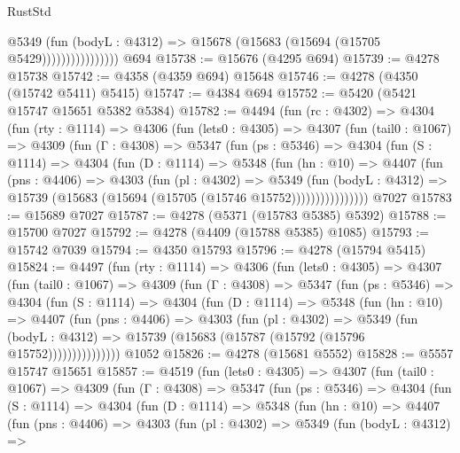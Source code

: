 \begin{lexlean}{RustStd}
\begin{coremodule}
{\begin{coremodule}
{{{{{{{{{{{{{{{{{{{{{{{{{{{{{{{{{{{                          @5349
                            (fun (bodyL : @4312) =>
                            @15678 (@15683 (@15694 (@15705 @5429))))))))))))))))
    @694
@15738 := @15676 (@4295 @694)
@15739 := @4278 @15738
@15742 := @4358 (@4359 @694) @15648
@15746 := @4278 (@4350 (@15742 @5411) @5415)
@15747 := @4384 @694
@15752 := @5420 (@5421 @15747 @15651 @5382 @5384)
@15782 := @4494
    (fun (rc : @4302) =>
    @4304
      (fun (rty : @1114) =>
      @4306
        (fun (lets0 : @4305) =>
        @4307
          (fun (tail0 : @1067) =>
          @4309
            (fun (Γ : @4308) =>
            @5347
              (fun (ps : @5346) =>
              @4304
                (fun (S : @1114) =>
                @4304
                  (fun (D : @1114) =>
                  @5348
                    (fun (hn : @10) =>
                    @4407
                      (fun (pns : @4406) =>
                      @4303
                        (fun (pl : @4302) =>
                        @5349
                          (fun (bodyL : @4312) =>
                          @15739 (@15683 (@15694 (@15705 (@15746 @15752))))))))))))))))
    @7027
@15783 := @15689 @7027
@15787 := @4278 (@5371 (@15783 @5385) @5392)
@15788 := @15700 @7027
@15792 := @4278 (@4409 (@15788 @5385) @1085)
@15793 := @15742 @7039
@15794 := @4350 @15793
@15796 := @4278 (@15794 @5415)
@15824 := @4497
    (fun (rty : @1114) =>
    @4306
      (fun (lets0 : @4305) =>
      @4307
        (fun (tail0 : @1067) =>
        @4309
          (fun (Γ : @4308) =>
          @5347
            (fun (ps : @5346) =>
            @4304
              (fun (S : @1114) =>
              @4304
                (fun (D : @1114) =>
                @5348
                  (fun (hn : @10) =>
                  @4407
                    (fun (pns : @4406) =>
                    @4303
                      (fun (pl : @4302) =>
                      @5349
                        (fun (bodyL : @4312) =>
                        @15739 (@15683 (@15787 (@15792 (@15796 @15752)))))))))))))))
    @1052
@15826 := @4278 (@15681 @5552)
@15828 := @5557 @15747 @15651
@15857 := @4519
    (fun (lets0 : @4305) =>
    @4307
      (fun (tail0 : @1067) =>
      @4309
        (fun (Γ : @4308) =>
        @5347
          (fun (ps : @5346) =>
          @4304
            (fun (S : @1114) =>
            @4304
              (fun (D : @1114) =>
              @5348
                (fun (hn : @10) =>
                @4407
                  (fun (pns : @4406) =>
                  @4303
                    (fun (pl : @4302) =>
                    @5349
                      (fun (bodyL : @4312) =>
}}}}}}}}}}}}}}}}}}}}}}}}}}}}}}}}}}}
\end{coremodule}}
\end{coremodule}
\end{lexlean}
